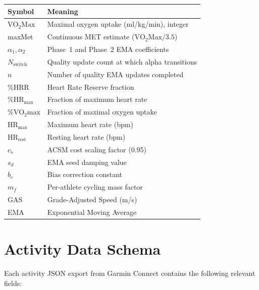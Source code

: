 \documentclass[11pt,a4paper]{article}
\begin{document}
\begin{table}[H]
\centering
\begin{tabular}{@{}ll@{}}
\toprule
\textbf{Symbol} & \textbf{Meaning} \\
\midrule
$\text{VO}_2\text{Max}$ & Maximal oxygen uptake (ml/kg/min), integer \\
maxMet & Continuous MET estimate ($\text{VO}_2\text{Max} / 3.5$) \\
$\alpha_1, \alpha_2$ & Phase~1 and Phase~2 EMA coefficients \\
$N_{\text{switch}}$ & Quality update count at which alpha transitions \\
$n$ & Number of quality EMA updates completed \\
$\%\text{HRR}$ & Heart Rate Reserve fraction \\
$\%\text{HR}_{\text{max}}$ & Fraction of maximum heart rate \\
$\%\text{VO}_2\text{max}$ & Fraction of maximal oxygen uptake \\
$\text{HR}_{\text{max}}$ & Maximum heart rate (bpm) \\
$\text{HR}_{\text{rest}}$ & Resting heart rate (bpm) \\
$c_s$ & ACSM cost scaling factor (0.95) \\
$s_d$ & EMA seed damping value \\
$b_c$ & Bias correction constant \\
$m_f$ & Per-athlete cycling mass factor \\
GAS & Grade-Adjusted Speed (m/s) \\
EMA & Exponential Moving Average \\
\bottomrule
\end{tabular}
\end{table}


\section{Activity Data Schema}
\label{app:schema}

Each activity JSON export from Garmin Connect contains the following relevant fields:
\end{document}

